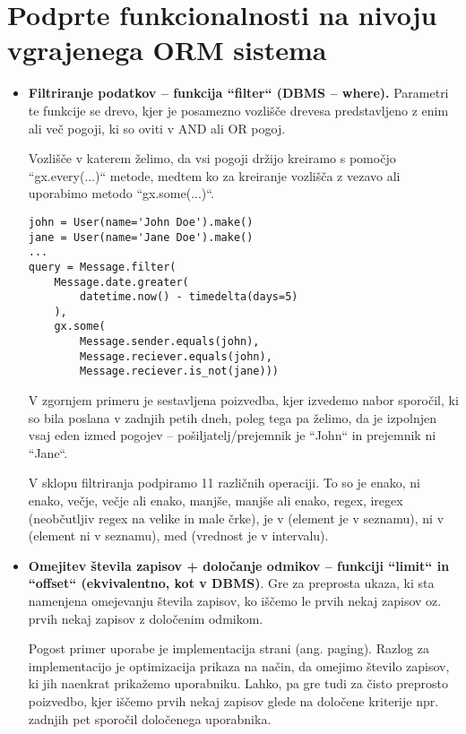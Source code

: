 \documentclass[a4paper,12pt,openright]{book}
\begin{document}
    \section{Podprte funkcionalnosti na nivoju vgrajenega ORM sistema}
    \begin{itemize}
        \item \textbf{Filtriranje podatkov – funkcija ``filter`` (DBMS – where).}
        \newline
        \noindent
        Parametri te funkcije se drevo, kjer je posamezno vozlišče drevesa predstavljeno z enim ali več pogoji, ki so oviti v AND ali OR pogoj.
        
        Vozlišče v katerem želimo, da vsi pogoji držijo kreiramo s pomočjo ``gx.every(...)`` metode, medtem ko za kreiranje vozlišča z vezavo ali uporabimo metodo ``gx.some(...)``.
        
\begin{verbatim}
john = User(name='John Doe').make()
jane = User(name='Jane Doe').make()
...
query = Message.filter(
    Message.date.greater(
        datetime.now() - timedelta(days=5)
    ),
    gx.some(
        Message.sender.equals(john),
        Message.reciever.equals(john),
        Message.reciever.is_not(jane)))
\end{verbatim}    

        \noindent
        V zgornjem primeru je sestavljena poizvedba, kjer izvedemo nabor sporočil, ki so bila poslana v zadnjih petih dneh, poleg tega pa želimo, da je izpolnjen vsaj eden izmed pogojev – pošiljatelj/prejemnik je ``John`` in prejemnik ni ``Jane``.

        V sklopu filtriranja podpiramo 11 različnih operaciji. To so je enako, ni enako, večje, večje ali enako, manjše, manjše ali enako, regex, iregex (neobčutljiv regex na velike in male črke), je v (element je v seznamu), ni v (element ni v seznamu), med (vrednost je v intervalu).
        
        \item \textbf{Omejitev števila zapisov + določanje odmikov – funkciji ``limit`` in ``offset`` (ekvivalentno, kot v DBMS)}. Gre za preprosta ukaza, ki sta namenjena omejevanju števila zapisov, ko iščemo le prvih nekaj zapisov oz. prvih nekaj zapisov z določenim odmikom. 

        Pogost primer uporabe je implementacija strani (ang. paging). Razlog za implementacijo je optimizacija prikaza na način, da omejimo število zapisov, ki jih naenkrat prikažemo uporabniku. Lahko, pa gre tudi za čisto preprosto poizvedbo, kjer iščemo prvih nekaj zapisov glede na določene kriterije npr. zadnjih pet sporočil določenega uporabnika.
        

\end{itemize}
\end{document}
